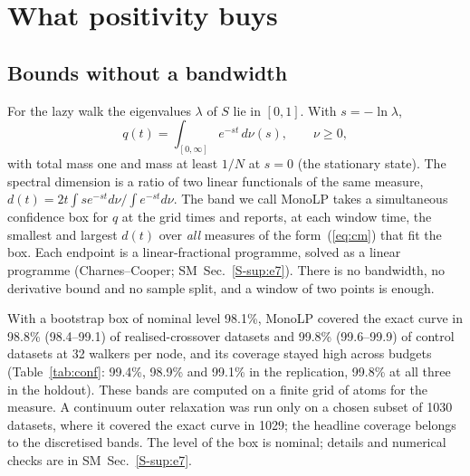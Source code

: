 \documentclass[aps,pre,twocolumn,superscriptaddress,nofootinbib,10pt]{revtex4-2}
\newcommand{\SM}{SM}
\newcommand{\nm}[1]{\textsf{#1}}
\newcommand{\MLP}{\nm{MonoLP}}
\begin{document}
\section{What positivity buys}\label{sec:pos}
\subsection{Bounds without a bandwidth}\label{sec:e7}
For the lazy walk the eigenvalues $\lambda$ of $S$ lie in $[0,1]$. With $s=-\ln\lambda$,
\begin{equation}
q(t)=\int_{[0,\infty]} e^{-st}\,d\nu(s),\qquad \nu\ge0,
\label{eq:cm}
\end{equation}
with total mass one and mass at least $1/N$ at $s=0$ (the stationary state). The spectral dimension is a ratio of two linear functionals of the same measure, $d(t)=2t\int se^{-st}d\nu/\int e^{-st}d\nu$. The band we call \MLP{} takes a simultaneous confidence box for $q$ at the grid times and reports, at each window time, the smallest and largest $d(t)$ over \emph{all} measures of the form~(\ref{eq:cm}) that fit the box. Each endpoint is a linear-fractional programme, solved as a linear programme (Charnes--Cooper; \SM\ Sec.~\ref{S-sup:e7}). There is no bandwidth, no derivative bound and no sample split, and a window of two points is enough.

With a bootstrap box of nominal level 98.1\%, \MLP{} covered the exact curve in 98.8\% (98.4--99.1) of realised-crossover datasets and 99.8\% (99.6--99.9) of control datasets at 32 walkers per node, and its coverage stayed high across budgets (Table~\ref{tab:conf}: 99.4\%, 98.9\% and 99.1\% in the replication, 99.8\% at all three in the holdout). These bands are computed on a finite grid of atoms for the measure. A continuum outer relaxation was run only on a chosen subset of 1030 datasets, where it covered the exact curve in 1029; the headline coverage belongs to the discretised bands. The level of the box is nominal; details and numerical checks are in \SM\ Sec.~\ref{S-sup:e7}.
\end{document}
